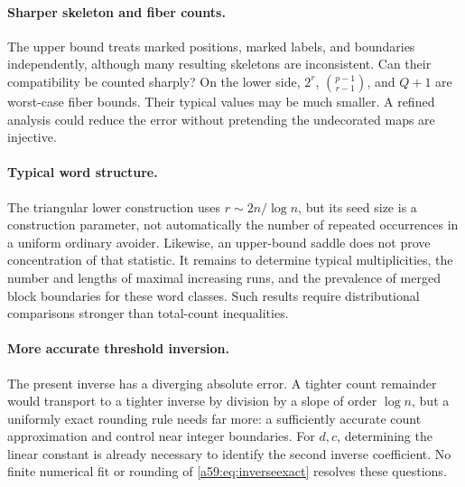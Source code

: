 \documentclass[11pt,letterpaper]{article}
\theoremstyle{remark}\newtheorem{remark}[theorem]{Remark}
\theoremstyle{remark}\newtheorem{wremark}{Remark}\renewcommand{\thewremark}{W\arabic{wremark}}
\theoremstyle{plain}\newtheorem{wcorollary}[wremark]{Corollary}
\begin{document}
\paragraph{Sharper skeleton and fiber counts.}
The upper bound treats marked positions, marked labels, and boundaries independently, although many resulting skeletons are inconsistent. Can their compatibility be counted sharply? On the lower side, $2^r$, $\binom{p-1}{r-1}$, and $Q+1$ are worst-case fiber bounds. Their typical values may be much smaller. A refined analysis could reduce the error without pretending the undecorated maps are injective.

\paragraph{Typical word structure.}
The triangular lower construction uses $r\sim2n/\log n$, but its seed size is a construction parameter, not automatically the number of repeated occurrences in a uniform ordinary avoider. Likewise, an upper-bound saddle does not prove concentration of that statistic. It remains to determine typical multiplicities, the number and lengths of maximal increasing runs, and the prevalence of merged block boundaries for these word classes. Such results require distributional comparisons stronger than total-count inequalities.

\paragraph{More accurate threshold inversion.}
The present inverse has a diverging absolute error. A tighter count remainder would transport to a tighter inverse by division by a slope of order $\log n$, but a uniformly exact rounding rule needs far more: a sufficiently accurate count approximation and control near integer boundaries. For $d,c$, determining the linear constant is already necessary to identify the second inverse coefficient. No finite numerical fit or rounding of \eqref{a59:eq:inverseexact} resolves these questions.
\end{document}

